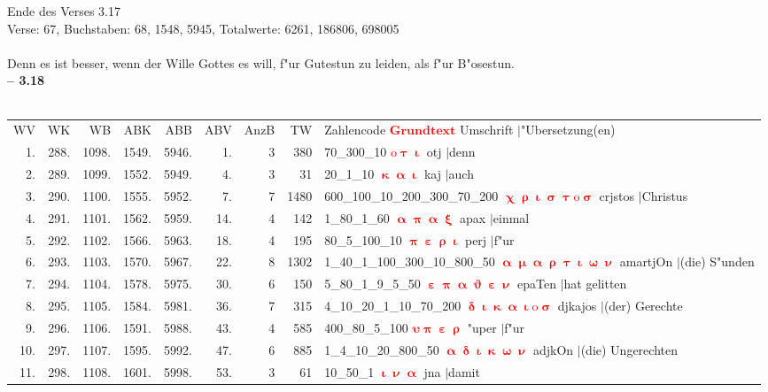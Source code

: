 \documentclass[a4paper,10pt,landscape]{article}
\begin{document}
Ende des Verses 3.17\\
Verse: 67, Buchstaben: 68, 1548, 5945, Totalwerte: 6261, 186806, 698005\\
\\
Denn es ist besser, wenn der Wille Gottes es will, f"ur Gutestun zu leiden, als f"ur B"osestun.\\
\newpage 
{\bf -- 3.18}\\
\medskip \\
\begin{tabular}{rrrrrrrrp{120mm}}
WV&WK&WB&ABK&ABB&ABV&AnzB&TW&Zahlencode \textcolor{red}{$\boldsymbol{Grundtext}$} Umschrift $|$"Ubersetzung(en)\\
1.&288.&1098.&1549.&5946.&1.&3&380&70\_300\_10 \textcolor{red}{$\boldsymbol{\mathrm{o}\uptau\upiota}$} otj $|$denn\\
2.&289.&1099.&1552.&5949.&4.&3&31&20\_1\_10 \textcolor{red}{$\boldsymbol{\upkappa\upalpha\upiota}$} kaj $|$auch\\
3.&290.&1100.&1555.&5952.&7.&7&1480&600\_100\_10\_200\_300\_70\_200 \textcolor{red}{$\boldsymbol{\upchi\uprho\upiota\upsigma\uptau\mathrm{o}\upsigma}$} crjstos $|$Christus\\
4.&291.&1101.&1562.&5959.&14.&4&142&1\_80\_1\_60 \textcolor{red}{$\boldsymbol{\upalpha\uppi\upalpha\upxi}$} apax $|$einmal\\
5.&292.&1102.&1566.&5963.&18.&4&195&80\_5\_100\_10 \textcolor{red}{$\boldsymbol{\uppi\upepsilon\uprho\upiota}$} perj $|$f"ur\\
6.&293.&1103.&1570.&5967.&22.&8&1302&1\_40\_1\_100\_300\_10\_800\_50 \textcolor{red}{$\boldsymbol{\upalpha\upmu\upalpha\uprho\uptau\upiota\upomega\upnu}$} amartjOn $|$(die) S"unden\\
7.&294.&1104.&1578.&5975.&30.&6&150&5\_80\_1\_9\_5\_50 \textcolor{red}{$\boldsymbol{\upepsilon\uppi\upalpha\upvartheta\upepsilon\upnu}$} epaTen $|$hat gelitten\\
8.&295.&1105.&1584.&5981.&36.&7&315&4\_10\_20\_1\_10\_70\_200 \textcolor{red}{$\boldsymbol{\updelta\upiota\upkappa\upalpha\upiota\mathrm{o}\upsigma}$} djkajos $|$(der) Gerechte\\
9.&296.&1106.&1591.&5988.&43.&4&585&400\_80\_5\_100 \textcolor{red}{$\boldsymbol{\upsilon\uppi\upepsilon\uprho}$} "uper $|$f"ur\\
10.&297.&1107.&1595.&5992.&47.&6&885&1\_4\_10\_20\_800\_50 \textcolor{red}{$\boldsymbol{\upalpha\updelta\upiota\upkappa\upomega\upnu}$} adjkOn $|$(die) Ungerechten\\
11.&298.&1108.&1601.&5998.&53.&3&61&10\_50\_1 \textcolor{red}{$\boldsymbol{\upiota\upnu\upalpha}$} jna $|$damit\\

\end{tabular}
\end{document}
